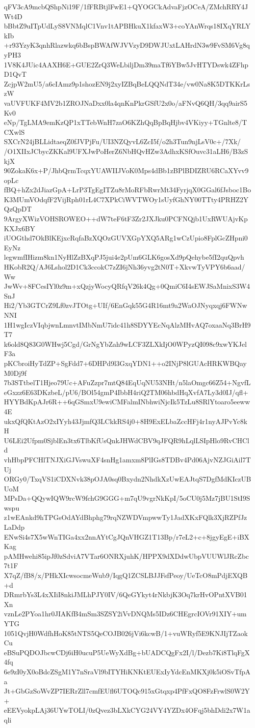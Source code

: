 qFV3cA9mcbQShpNi19F/1fFRBtjlFwE1+QYOGCkAdvaFjzOCeA/ZMchRRY4JWt4D
bBbtZ9uITpUdLyS8VNMqlC1Vnv1tAPBHkuX1kfaxW3+coYAnWrqs18IXqYRLYkIb
+r93YzyK3qnhRlazwkq6bBspBWAfWJVVzyD9DWJUxtLAHrdN3w9FvSM6Vg8qyPH3
1V8K4JUic4AAXH6E+GUE2ZrQ3WeLbiljDm39maTf6YBw5JvHTYDswk4ZFhpD1QvT
ZcjpW2mU5/a6cIAmz9p1shozEN9j2xyIZBqBeLQQNdT34e/vw0Na8K5DTKKrLszW
vaUVFUKF4MV2b1ZROJNaDxx0la4qnKnPkrGSfU2x0o/aFNvQ6QH/3qq9airS5Kv0
eNp/TgLMA9emKzQP1xTTebWnH7zaO6KZhQqBpBqHjbv4VKiyy+TGnlte8/TCXwlS
SXCrN24jBLLidtaeqZ0fJVPjFu/UI3NZQyvL6ZcI5f/o2h3Tun9njLsV0c+/7Xk/
/O1XIIxJCbycZKKal9UFXJwPoHerZ6NbHQvHZw3AdhxKSfOuvc31aLH6/B3zSkjX
90ZokaK6x+P/JhbQrmTcqxYUAWIIJVoK0Mps4dBb1zBPlBDIZRU6RCaXYvv9opLc
fBQ+hZx2dJiazGpA+LrP3TgEgITZu8rMoRFbRwrMt34FyrjqX0GGal6fJsboc1Bo
K3MUmVOdqfF2VijRph01rL4C7XPkCiWVTWOy1sUyfGhNY00TTty4PRHZ2YQzQpDT
9ArgyXWizVOHSROWEO++dW7teF6tF3Zr2JXJku0PCFNQjb1UxRWUAjvKpKXJx6BY
iUOGthd7OkBlKEjxcRqfaBzXQOzGUVXGpYXQ5ARg1wCzUpio8FplGcZHpni0EyNz
legwmfIHizm8kn1NyHlZzBXqPJ5jui4e2pUm6GLK6gosXd9pQehybe5fI2quQpvh
HKobR2Q/AJ6Lshol2D1Ck3ccokC7zZI6jNh36yvg2tN0T+XkvwTyVPY6b6aad/Ww
JwWv+8FCesIYl0z9m+xQzjyWocyQRfqV26k4Qg+0QmiC6I4sEWJSaMnixS3W4SnJ
Hi2/Yb3GTCrZ9Lf0zvJTOtg+UIf/6EnGqk55G4R16mt9a2WaOJNyqxqj6FWNwNNI
1H1wgIczVIqbjwnLmnvtIMbNmU7idc41h8SDYYEcNqAlzMHvAQ7oxaaNq3BrH9T7
k6old8Q83G0WHwj5Cgd/GrNgYbZah9wLCF3ZLXkIjO0WPyzQI098c9xwYKJelF3a
pKCbroiHyTdZP+SgFdd7+6DHPd9l3GxqYDN1++o2INjP8lGUAcHRKWBQayM0Dj9f
7b3STtbelT1Hjeo79Uc+AFuZzpr7mtQ84EqUqNU53NHt/n5laOmgc66Z54+NgvfL
eGxzz6E63DKzbeL/pU6/BOl54gmP4IbbH4riQ2TM06hbdHqXvfA7Ly3d0IJ/qfl+
HYYBdKpAJr6R++6qGSmxU9ewiCMFalmINbhwiNjcIk5TzLu8SRlYtoaro5eeww4E
ukxQfQKtAzO2xIYyh43JjmfQ3LCkkRS4j0+8H9ExELbaZccHFj4r1nyAJPvYc8kH
U6LEi2Ufpm0SjblEn3tx6TlbKfUsQnkJHWdCBV9qJFQR9hLqlLSIpHlo9RvCHCld
vhHbpPFCHlTNJXiGJVswuXF4snHg1amxm8PlIGs8TDBv4Pd06AjvNZJGiAil7TUj
ORGy0/TxqVS1iCDXNvk38pOJA0sq0Bxydn2NhdkXzUwEAJtqS7DgfMdKIczUBUoM
MPsDa+QQywIQW9rcW9fchG9GGG+m7qU9vgrNkKpI/5oCU0j5Mz7jBU1StI9Swspu
z1wEAnkd9hTPGsOdAYdBhphg79rqNZWDVmpwwTy1JadXKxFQlk3XjRZPfJzLaDdp
ENwSi4s7X5wWnTIGa4xx2nnAYtCgJQnVHGZ1T13Bp/r7eL2+c+8jgyEgE+iBXKag
pAMHwehi85ipJf0zSdviA7VTar6ONRXjuhK/HPPX9dXDdwUbpVUUWlJRcZbc7t1F
X7qZ/fB8/x/PHkXIcwsocmeWub9/IqgQ1ZCSLBJJFsfPeoy/UeTcO8mPdjEXQB+d
DRmrbYs3L4xXIiI8nkiJMLhPJY0IV/6QeGYkyt4rNkbjK3Oq7krHvOPntXVB01Xn
vznLe2PYoa1hr0JIAKfB4mSm3SZSY2iVvDNQMs5IDz6CHEgrcIOVr91XIY+umYTG
1051QvjH0WdfhHoK85tNTS5QeCOJB026jVi6kcwB/1+vuWRyf5E9KNJIjTZaokCu
eBSuPQDOJbcwCDj6iH0ucuP5UeWyXdBg+bUADCQgFx2I/l/Dezb7Ki8TlqFgX4fq
6e9zI0yX0oBdcZSgM1Y7nSraVl9bITYHiKNKtEUExIyYdcEnMKXj0k5iOSvTfpAa
Jt+GbGzSoWvZP7IERrZll7cmfEUfl6UTOQc915xGtqxp4PfFxQO8FzFrwlS0W2Y+
eEEVyokpLAj36UYwTOLI/0zQvez3bLXkCYG24VY4YZDx4OFqj5bhDdi2x7W1aqli
